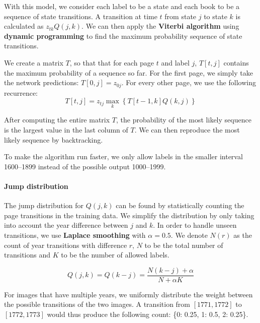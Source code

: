 With this model, we consider each label to be a state and each book to be a sequence of state transitions. A transition at time $t$ from state $j$ to state $k$ is calculated as $z_{tk} Q(j, k)$. We can then apply the \textbf{Viterbi algorithm} using \textbf{dynamic programming} to find the maximum probability sequence of state transitions.

We create a matrix $T$, so that that for each page $t$ and label $j$, $T[t,j]$ contains the maximum probability of a sequence so far. For the first page, we simply take the network predictions: $T[0,j] = z_{0j}$. For every other page, we use the following recurrence:
\[
T[t,j] = z_{tj} \max_k \left\{ T[t-1,k] Q(k, j) \right\}
\]

After computing the entire matrix $T$, the probability of the most likely sequence is the largest value in the last column of $T$. We can then reproduce the most likely sequence by backtracking.

To make the algorithm run faster, we only allow labels in the smaller interval 1600--1899 instead of the possible output 1000--1999.

\paragraph{Jump distribution}
The jump distribution for $Q(j, k)$ can be found by statistically counting the page transitions in the training data. We simplify the distribution by only taking into account the year difference between $j$ and $k$. In order to handle unseen transitions, we use \textbf{Laplace smoothing} with $\alpha=0.5$. We denote $N(r)$ as the count of year transitions with difference $r$, $N$ to be the total number of transitions and $K$ to be the number of allowed labels.

\[
Q(j, k) = Q(k-j) = \frac{N(k-j) + \alpha}{N + \alpha K}
\]

For images that have multiple years, we uniformly distribute the weight between the possible transitions of the two images. A transition from $[1771, 1772]$ to $[1772, 1773]$ would thus produce the following count: \{0: 0.25, 1: 0.5, 2: 0.25\}.

